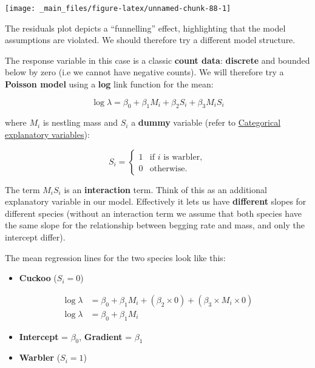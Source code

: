 \documentclass[]{book}
\providecommand{\tightlist}{%
  \setlength{\itemsep}{0pt}\setlength{\parskip}{0pt}}
\theoremstyle{definition}
\theoremstyle{definition}
\theoremstyle{definition}
\theoremstyle{remark}
\begin{document}
\begin{center}\texttt{[image: \_main\_files/figure-latex/unnamed-chunk-88-1]} \end{center}

The residuals plot depicts a ``funnelling'' effect, highlighting that
the model assumptions are violated. We should therefore try a different
model structure.

The response variable in this case is a classic \textbf{count data}:
\textbf{discrete} and bounded below by zero (i.e we cannot have negative
counts). We will therefore try a \textbf{Poisson model} using a
\textbf{log} link function for the mean:

\[
    \log{\lambda} = \beta_0 + \beta_1 M_i + \beta_2 S_i + \beta_3 M_i S_i
\]

where \(M_i\) is nestling mass and \(S_i\) a \textbf{dummy} variable
(refer to \protect\hyperlink{sec:categorical}{Categorical explanatory
variables}):

\[
S_i = \left\{\begin{array}{ll}
        1 & \mbox{if $i$ is warbler},\\
        0 & \mbox{otherwise}.
        \end{array}
        \right.
\]

The term \(M_iS_i\) is an \textbf{interaction} term. Think of this as an
additional explanatory variable in our model. Effectively it lets us
have \textbf{different} slopes for different species (without an
interaction term we assume that both species have the same slope for the
relationship between begging rate and mass, and only the intercept
differ).

The mean regression lines for the two species look like this:

\begin{itemize}
\tightlist
\item
  \textbf{Cuckoo} (\(S_i=0\))
\end{itemize}

\[
\begin{aligned}
    \log{\lambda} & = \beta_0 + \beta_1 M_i + (\beta_2 \times 0)  + (\beta_3 \times M_i \times 0)\\
    \log{\lambda} & = \beta_0 + \beta_1 M_i
\end{aligned}
\]

\begin{itemize}
\item
  \textbf{Intercept} = \(\beta_0\), \textbf{Gradient} = \(\beta_1\)
\item
  \textbf{Warbler} (\(S_i=1\))
\end{itemize}
\end{document}
